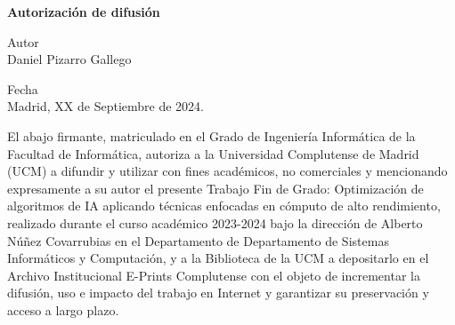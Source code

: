 
\newpage

\thispagestyle{empty}

\begin{center}

{\bf \Huge Autorización de difusión}

\vspace{1cm}


   \large Autor\\
   Daniel Pizarro Gallego

   \vspace{0.5cm}


   Fecha\\
   Madrid, XX de Septiembre de 2024.

   \vspace{0.5cm}
   \end{center}
   
El abajo firmante, matriculado en el Grado de Ingeniería Informática de la Facultad de Informática, autoriza a la Universidad Complutense de Madrid (UCM) a difundir y utilizar con fines académicos, no comerciales y mencionando expresamente a su autor el presente Trabajo Fin de Grado: Optimización de algoritmos de IA aplicando técnicas enfocadas en cómputo de alto rendimiento, realizado durante el curso académico 2023-2024 bajo la dirección de Alberto Núñez Covarrubias en el Departamento de Departamento de Sistemas Informáticos y Computación, y a la Biblioteca de la UCM a depositarlo en el Archivo Institucional E-Prints Complutense con el objeto de incrementar la difusión, uso e impacto del trabajo en Internet y garantizar su preservación y acceso a largo plazo.

